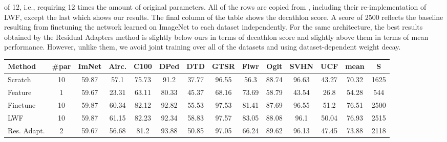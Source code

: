 \documentclass[10pt,journal,compsoc]{IEEEtran}
\begin{document}
of 12, i.e., requiring 12 times the amount of original parameters.
All of the rows are copied from \cite{rebuffi2017learning}, including
their re-implementation of LWF, except the last which shows our results.
The final column of the table shows the decathlon score. A score of
2500 reflects the baseline resulting from finetuning the network learned
on ImageNet to each dataset independently. For the same architecture,
the best results obtained by the Residual Adapters method is slightly
 below ours in terms of decathlon score and slightly above them in
terms of mean performance. However, unlike them, we avoid joint training
over all of the datasets and using dataset-dependent weight decay. 
\begin{center}
\begin{table*}
\begin{centering}{\small{}}%
\begin{tabular}{>{\raggedright}m{}ccccccccccc||cc}{\small{}Method} & {\small{}\#par} & {\small{}ImNet} & {\small{}Airc.} & {\small{}C100} & {\small{}DPed} & {\small{}DTD} & {\small{}GTSR} & {\small{}Flwr} & {\small{}Oglt} & {\small{}SVHN} & {\small{}UCF} & {\small{}mean} & {\small{}S}\tabularnewline
\hline{\small{}Scratch} & {\small{}10} & {\small{}59.87 } & {\small{}57.1 } & {\small{}75.73 } & {\small{}91.2 } & {\small{}37.77 } & {\small{}96.55 } & {\small{}56.3 } & {\small{}88.74 } & {\small{}96.63 } & {\small{}43.27 } & {\small{}70.32 } & {\small{}1625 }\tabularnewline
\hline 
\hline{\small{}Feature} & {\small{}1} & {\small{}59.67 } & {\small{}23.31 } & {\small{}63.11 } & {\small{}80.33 } & {\small{}45.37 } & {\small{}68.16 } & {\small{}73.69 } & {\small{}58.79 } & {\small{}43.54 } & {\small{}26.8 } & {\small{}54.28 } & {\small{}544 }\tabularnewline
\hline 
\hline{\small{}Finetune} & {\small{}10} & {\small{}59.87 } & {\small{}60.34 } & {\small{}82.12 } & {\small{}92.82 } & {\small{}55.53 } & {\small{}97.53 } & {\small{}81.41 } & {\small{}87.69 } & {\small{}96.55 } & {\small{}51.2 } & {\small{}76.51 } & {\small{}2500 }\tabularnewline
\hline 
\hline{\small{}LWF} & {\small{}10} & {\small{}59.87 } & {\small{}61.15 } & {\small{}82.23 } & {\small{}92.34 } & {\small{}58.83 } & {\small{}97.57 } & {\small{}83.05 } & {\small{}88.08 } & {\small{}96.1 } & {\small{}50.04 } & {\small{}76.93 } & {\small{}2515 }\tabularnewline
\hline 
\hline{\small{}Res. Adapt. } & {\small{}2} & {\small{}59.67 } & {\small{}56.68 } & {\small{}81.2 } & {\small{}93.88 } & {\small{}50.85 } & {\small{}97.05 } & {\small{}66.24 } & {\small{}89.62 } & {\small{}96.13 } & {\small{}47.45 } & {\small{}73.88 } & {\small{}2118 }\tabularnewline

\end{tabular}
\end{centering}
\end{table*}
\end{center}
\end{document}
